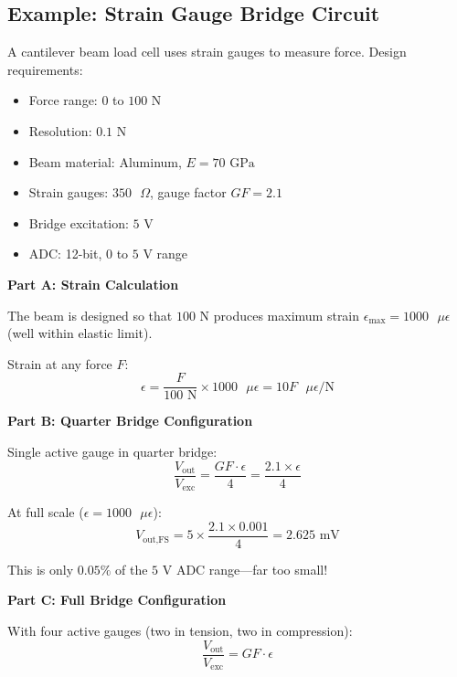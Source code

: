 \subsection{Example: Strain Gauge Bridge Circuit}
\label{ex:strain_gauge}

\begin{example}

A cantilever beam load cell uses strain gauges to measure force. Design requirements:
\begin{itemize}
    \item Force range: $0$ to $100\text{ N}$
    \item Resolution: $0.1\text{ N}$
    \item Beam material: Aluminum, $E = 70\text{ GPa}$
    \item Strain gauges: $350\text{ }\Omega$, gauge factor $GF = 2.1$
    \item Bridge excitation: $5\text{ V}$
    \item ADC: 12-bit, $0$ to $5\text{ V}$ range
\end{itemize}

\textbf{Part A: Strain Calculation}

The beam is designed so that $100\text{ N}$ produces maximum strain $\epsilon_{\max} = 1000\text{ }\mu\epsilon$ (well within elastic limit).

Strain at any force $F$:
\begin{equation}
\epsilon = \frac{F}{100\text{ N}} \times 1000\text{ }\mu\epsilon = 10F\text{ }\mu\epsilon/\text{N}
\end{equation}

\textbf{Part B: Quarter Bridge Configuration}

Single active gauge in quarter bridge:
\begin{equation}
\frac{V_{\text{out}}}{V_{\text{exc}}} = \frac{GF \cdot \epsilon}{4} = \frac{2.1 \times \epsilon}{4}
\end{equation}

At full scale ($\epsilon = 1000\text{ }\mu\epsilon$):
\begin{equation}
V_{\text{out,FS}} = 5 \times \frac{2.1 \times 0.001}{4} = 2.625\text{ mV}
\end{equation}

This is only $0.05\%$ of the $5\text{ V}$ ADC range---far too small!

\textbf{Part C: Full Bridge Configuration}

With four active gauges (two in tension, two in compression):
\begin{equation}
\frac{V_{\text{out}}}{V_{\text{exc}}} = GF \cdot \epsilon
\end{equation}


\end{example}

